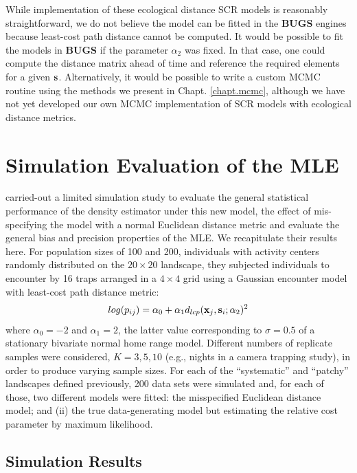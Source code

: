 While implementation of these ecological distance SCR models is
reasonably straightforward, we do not believe the model can be fitted
in the  {\bf BUGS} engines because least-cost path distance cannot be computed.
It would be possible to fit the models
in {\bf BUGS} if the parameter $\alpha_{2}$ was fixed. In that case,
one could compute the distance matrix ahead of time and reference the
required elements for a given ${\bf s}$.
Alternatively, it would be possible to write a custom MCMC routine
using the methods we present in Chapt. \ref{chapt.mcmc}, although we
have not yet developed our own MCMC implementation of SCR models with
ecological distance metrics. 


\section{Simulation Evaluation of the MLE}

\citet{royle_etal:2012ecol}
carried-out a limited simulation study to evaluate the
general statistical performance of the density estimator under
this new model, the effect of mis-specifying the model with a
normal Euclidean distance metric and evaluate the general bias and
precision properties of the MLE.
We recapitulate their results here.
For population sizes of 100 and 200, individuals with activity
centers randomly distributed on the $20 \times 20$ landscape, they
subjected individuals
to encounter by 16 traps arranged in a $4\times 4$ grid
using a Gaussian
encounter model with least-cost path distance metric:
\[
log(p_{ij})= \alpha_{0} + \alpha_{1} d_{lcp}({\bf x}_{j},{\bf
  s}_{i}; \alpha_{2})^{2}
\]
where  $\alpha_{0} = -2$ and $\alpha_{1} = 2$, the latter value
corresponding to $\sigma = 0.5$ of a stationary bivariate normal home
range model.  Different numbers of replicate samples were considered,
$K=3,5,10$
(e.g., nights in a camera trapping study), in order
to produce varying sample
sizes.
For each of the ``systematic'' and ``patchy'' landscapes defined
previously, 200 data sets were simulated and, for each of those, two
different models were fitted: the misspecified Euclidean distance
model; and (ii) the true data-generating model but estimating the
relative cost parameter by maximum likelihood.

\subsection{Simulation Results}

